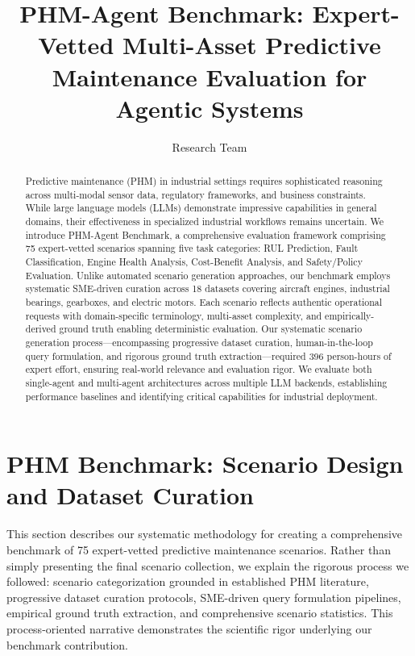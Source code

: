 \documentclass[sigconf]{acmart}
\begin{document}
\title{PHM-Agent Benchmark: Expert-Vetted Multi-Asset Predictive Maintenance Evaluation for Agentic Systems}

\author{Research Team}

\begin{abstract}
Predictive maintenance (PHM) in industrial settings requires sophisticated reasoning across multi-modal sensor data, regulatory frameworks, and business constraints. While large language models (LLMs) demonstrate impressive capabilities in general domains, their effectiveness in specialized industrial workflows remains uncertain. We introduce PHM-Agent Benchmark, a comprehensive evaluation framework comprising 75 expert-vetted scenarios spanning five task categories: RUL Prediction, Fault Classification, Engine Health Analysis, Cost-Benefit Analysis, and Safety/Policy Evaluation. Unlike automated scenario generation approaches, our benchmark employs systematic SME-driven curation across 18 datasets covering aircraft engines, industrial bearings, gearboxes, and electric motors. Each scenario reflects authentic operational requests with domain-specific terminology, multi-asset complexity, and empirically-derived ground truth enabling deterministic evaluation. Our systematic scenario generation process---encompassing progressive dataset curation, human-in-the-loop query formulation, and rigorous ground truth extraction---required 396 person-hours of expert effort, ensuring real-world relevance and evaluation rigor. We evaluate both single-agent and multi-agent architectures across multiple LLM backends, establishing performance baselines and identifying critical capabilities for industrial deployment.
\end{abstract}

\maketitle

\section{PHM Benchmark: Scenario Design and Dataset Curation}
\label{sec:scenarios}

This section describes our systematic methodology for creating a comprehensive benchmark of 75 expert-vetted predictive maintenance scenarios. Rather than simply presenting the final scenario collection, we explain the rigorous process we followed: scenario categorization grounded in established PHM literature, progressive dataset curation protocols, SME-driven query formulation pipelines, empirical ground truth extraction, and comprehensive scenario statistics. This process-oriented narrative demonstrates the scientific rigor underlying our benchmark contribution.
\end{document}

